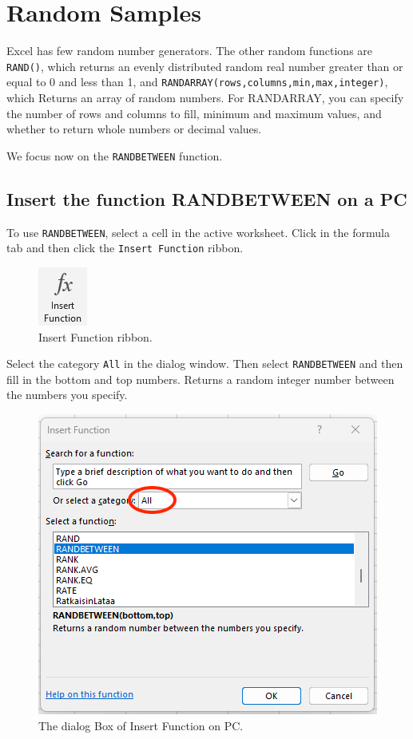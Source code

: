 \documentclass[
]{book}
\begin{document}
\hypertarget{random-samples}{%
\section{Random Samples}\label{random-samples}}

Excel has few random number generators. The other random functions are \texttt{RAND()}, which returns an evenly distributed random real number greater than or equal to 0 and less than 1, and \texttt{RANDARRAY(rows,columns,min,max,integer)}, which Returns an array of random numbers. For RANDARRAY, you can specify the number of rows and columns to fill, minimum and maximum values, and whether to return whole numbers or decimal values.

We focus now on the \texttt{RANDBETWEEN} function.

\hypertarget{insert-the-function-randbetween-on-a-pc}{%
\subsection{Insert the function RANDBETWEEN on a PC}\label{insert-the-function-randbetween-on-a-pc}}

To use \texttt{RANDBETWEEN}, select a cell in the active worksheet. Click in the formula tab and then click the \texttt{Insert\ Function} ribbon.

\begin{figure}

{\centering \includegraphics[width=0.1\linewidth]{fx-pc} 

}

\caption{Insert Function ribbon.}\label{fig:function-button}
\end{figure}

Select the category \texttt{All} in the dialog window. Then select \texttt{RANDBETWEEN} and then fill in the bottom and top numbers. Returns a random integer number between the numbers you specify.

\begin{figure}

{\centering \includegraphics[width=0.6\linewidth]{randbetween-pc} 

}

\caption{The dialog Box of Insert Function on PC.}\label{fig:irandbetween-pc}
\end{figure}
\end{document}
